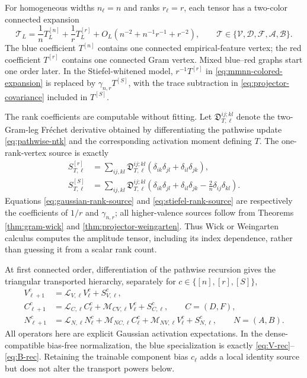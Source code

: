 \documentclass{article}
\begin{document}
For homogeneous widths \(n_\ell=n\) and ranks \(r_\ell=r\), each tensor has a
two-color connected expansion
\begin{equation}
\mathcal T_L=\frac1nT_L^{[n]}+\frac1rT_L^{[r]}
+O_{L}(n^{-2}+n^{-1}r^{-1}+r^{-2}),
\qquad
\mathcal T\in\{\mathcal V,\mathcal D,\mathcal F,\mathcal A,\mathcal B\}.
\label{eq:mmnn-colored-expansion}
\end{equation}
The blue coefficient \(T^{[n]}\) contains one connected empirical-feature
vertex; the red coefficient \(T^{[r]}\) contains one connected Gram vertex.
Mixed blue--red graphs start one order later.  In the Stiefel-whitened model,
\(r^{-1}T^{[r]}\) in \eqref{eq:mmnn-colored-expansion} is replaced by
\(\gamma_{n,r}T^{[S]}\), with the trace subtraction in
\eqref{eq:projector-covariance} included in \(T^{[S]}\).

The rank coefficients are computable without fitting.  Let
\(\mathfrak D_{T,\ell}^{ij;kl}\) denote the two-Gram-leg Fr\'echet derivative
obtained by differentiating the pathwise update \eqref{eq:pathwise-ntk} and
the corresponding activation moment defining \(T\).  The one-rank-vertex
source is exactly
\begin{align}
S_{T,\ell}^{[r]}
&=\sum_{ij,kl}\mathfrak D_{T,\ell}^{ij;kl}
(\delta_{ik}\delta_{jl}+\delta_{il}\delta_{jk}),
\label{eq:gaussian-rank-source}\\
S_{T,\ell}^{[S]}
&=\sum_{ij,kl}\mathfrak D_{T,\ell}^{ij;kl}
\left(\delta_{ik}\delta_{jl}+\delta_{il}\delta_{jk}
-\frac2n\delta_{ij}\delta_{kl}\right).
\label{eq:stiefel-rank-source}
\end{align}
Equations \eqref{eq:gaussian-rank-source} and
\eqref{eq:stiefel-rank-source} are respectively the coefficients of \(1/r\)
and \(\gamma_{n,r}\); all higher-valence sources follow from Theorems
\ref{thm:gram-wick} and \ref{thm:projector-weingarten}.  Thus Wick or
Weingarten calculus computes the amplitude tensor, including its index
dependence, rather than guessing it from a scalar rank count.

At first connected order, differentiation of the pathwise recursion gives
the triangular transported hierarchy, separately for
\(c\in\{[n],[r],[S]\}\),
\begin{align}
V^{c}_{\ell+1}&=\mathcal L_{V,\ell}V^c_\ell+S^c_{V,\ell},
\label{eq:mmnn-V-hierarchy}\\
C^{c}_{\ell+1}&=\mathcal L_{C,\ell}C^c_\ell
+\mathcal M_{CV,\ell}V^c_\ell+S^c_{C,\ell},
\qquad C=(D,F),
\label{eq:mmnn-C-hierarchy}\\
N^{c}_{\ell+1}&=\mathcal L_{N,\ell}N^c_\ell
+\mathcal M_{NC,\ell}C^c_\ell
+\mathcal M_{NV,\ell}V^c_\ell+S^c_{N,\ell},
\qquad N=(A,B).
\label{eq:mmnn-N-hierarchy}
\end{align}
All operators here are explicit Gaussian activation expectations.  In the
dense-compatible bias-free normalization, the blue specialization is
exactly \eqref{eq:V-rec}--\eqref{eq:B-rec}.  Retaining the trainable component
bias \(c_\ell\) adds a local identity source but does not alter the transport
powers below.
\end{document}
